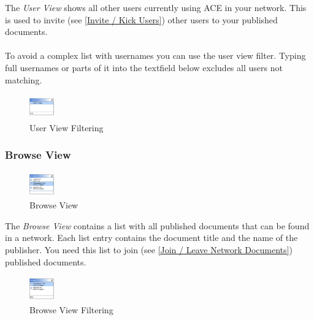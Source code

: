 \documentclass[11pt,a4paper]{article}
\begin{document}
The \textit{User View} shows all other users currently using ACE in your network. This is used to invite (see \ref{Invite / Kick Users}) other users to your published documents. \\
\\
To avoid a complex list with usernames you can use the user view filter. Typing full usernames or parts of it into the textfield below excludes all users not matching.

\begin{figure}[htbp]
\begin{center}
  \includegraphics[height=30pt, width=30pt]{../images/usermanual/uview_filtering.bmp.eps}
\caption{User View Filtering}
\label{default}
\end{center}
\end{figure}

\subsubsection{Browse View}

\begin{figure}[htbp]
\begin{center}
  \includegraphics[height=30pt, width=30pt]{../images/usermanual/bview_overview.bmp.eps}
\caption{Browse View}
\label{default}
\end{center}
\end{figure}

The \textit{Browse View} contains a list with all published documents that can be found in a network. Each list entry contains the document title and the name of the publisher. You need this list to join (see \ref{Join / Leave Network Documents}) published documents.

\begin{figure}[htbp]
\begin{center}
  \includegraphics[height=30pt, width=30pt]{../images/usermanual/bview_filtering.bmp.eps}
\caption{Browse View Filtering}
\label{default}
\end{center}
\end{figure}
\end{document}
